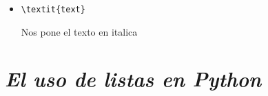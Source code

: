 \documentclass{book}
\begin{document}
\begin{enumerate}
\begin{itemize}
\begin{lstlisting}
\end{thebibliography}		
		\end{lstlisting} Nos sirve para agregar las referencias bibliograficas
		\item
		\begin{lstlisting} 
\textit{text}		
		\end{lstlisting} Nos pone el texto en italica
		
		
		
	\end{itemize}
	
	
	
	
\end{enumerate}%




	\section{\textit{El uso de listas en Python}}

\begin{flushright}
	\date{18 de enero de 2019}
\end{flushright}
\end{document}
